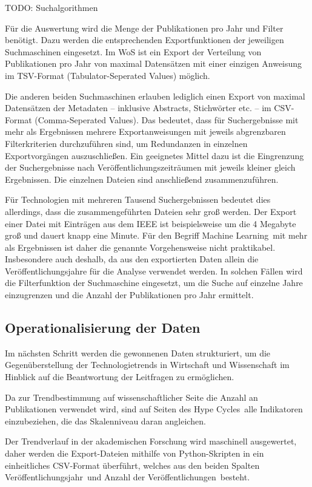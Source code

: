 TODO: Suchalgorithmen

Für die Auswertung wird die Menge der Publikationen pro Jahr und Filter benötigt. Dazu werden die entsprechenden Exportfunktionen der jeweiligen Suchmaschinen eingesetzt. Im WoS ist ein Export der Verteilung von Publikationen pro Jahr von maximal  Datensätzen mit einer einzigen Anweisung im TSV-Format (Tabulator-Seperated Values) möglich.

Die anderen beiden Suchmaschinen erlauben lediglich einen Export von maximal  Datensätzen der Metadaten -- inklusive Abstracts, Stichwörter etc. -- im CSV-Format (Comma-Seperated Values). Das bedeutet, dass für Suchergebnisse mit mehr als  Ergebnissen mehrere Exportanweisungen mit jeweils abgrenzbaren Filterkriterien durchzuführen sind, um Redundanzen in einzelnen Exportvorgängen auszuschließen. Ein geeignetes Mittel dazu ist die Eingrenzung der Suchergebnisse nach Veröffentlichungs\-zeiträumen mit jeweils kleiner gleich  Ergebnissen. Die einzelnen Dateien sind anschließend zusammenzuführen.

Für Technologien mit mehreren Tausend Such\-ergebnissen bedeutet dies allerdings, dass die zusammengeführten Dateien sehr groß werden. Der Export einer Datei mit  Einträgen aus dem IEEE ist beispielsweise um die 4 Megabyte groß und dauert knapp eine Minute. Für den Begriff \glqq Machine Learning\grqq~mit mehr als  Ergebnissen ist daher die genannte Vorgehensweise nicht praktikabel. Insbesondere auch deshalb, da aus den exportierten Daten allein die Veröffentlichungsjahre für die Analyse verwendet werden. In solchen Fällen wird die Filterfunktion der Suchmaschine eingesetzt, um die Suche auf einzelne Jahre einzugrenzen und die Anzahl der Publikationen pro Jahr ermittelt.

\subsection{Operationalisierung der Daten}
Im nächsten Schritt werden die gewonnenen Daten strukturiert, um die Gegenüberstellung der Technologietrends in Wirtschaft und Wissenschaft im Hinblick auf die Beantwortung der Leitfragen zu ermöglichen.

Da zur Trendbestimmung auf wissenschaftlicher Seite die Anzahl an Publikationen verwendet wird, sind auf Seiten des \glqq Hype Cycles\grqq~alle Indikatoren einzubeziehen, die das Skalenniveau daran angleichen.

Der Trendverlauf in der akademischen Forschung wird maschinell ausgewertet, daher werden die Export-Dateien mithilfe von Python-Skripten in ein einheitliches CSV-Format überführt, welches aus den beiden Spalten \glqq Veröffentlichungsjahr\grqq~und \glqq Anzahl der Veröffentlichungen\grqq~besteht.

